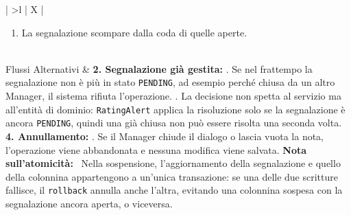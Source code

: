 \begin{xltabular}{\textwidth}{| >{\bfseries}l | X |}
\begin{enumerate}[leftmargin=*, nosep]
\begin{itemize}[leftmargin=*, nosep]
        \item \textbf{Sospendi la colonnina (\texttt{<<extend>>}):}
        \begin{itemize}[leftmargin=*, nosep]
            \item[4b.] Inserisce la motivazione della sospensione, obbligatoria, e conferma.
            \item[5b.] Il sistema porta la segnalazione a \texttt{RESOLVED\_SUSPENDED} e la colonnina a \texttt{SUSPENDED}, in un'unica transazione.
        \end{itemize}
    \end{itemize}
    \item La segnalazione scompare dalla coda di quelle aperte.
\end{enumerate} \\ \hline
Flussi Alternativi &
\textbf{2. Segnalazione già gestita:} . Se nel frattempo la segnalazione non è più in stato \texttt{PENDING}, ad esempio perché chiusa da un altro Manager, il sistema rifiuta l'operazione. . La decisione non spetta al servizio ma all'entità di dominio: \texttt{RatingAlert} applica la risoluzione solo se la segnalazione è ancora \texttt{PENDING}, quindi una già chiusa non può essere risolta una seconda volta. \newline\newline
\textbf{4. Annullamento:} . Se il Manager chiude il dialogo o lascia vuota la nota, l'operazione viene abbandonata e nessuna modifica viene salvata. \newline\newline
\textbf{Nota sull'atomicità:} \newline
\textbullet\ Nella sospensione, l'aggiornamento della segnalazione e quello della colonnina appartengono a un'unica transazione: se una delle due scritture fallisce, il \texttt{rollback} annulla anche l'altra, evitando una colonnina sospesa con la segnalazione ancora aperta, o viceversa. \\ \hline

\end{xltabular}
